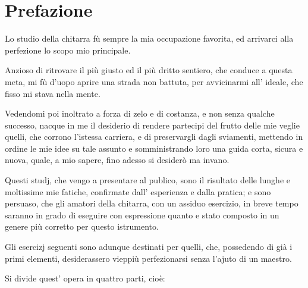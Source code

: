 \documentclass[a4paper]{article}
\begin{document}
\section*{Prefazione}

Lo studio della chitarra fù sempre la mia occupazione favorita, ed arrivarci alla perfezione lo scopo mio principale.

Anzioso di ritrovare il più giusto ed il più dritto sentiero, che conduce a questa meta, mi fù d'uopo aprire una strada non battuta, per avvicinarmi all' ideale, che fisso mi stava nella mente.

Vedendomi poi inoltrato a forza di zelo e di costanza, e non senza qualche successo, nacque in me il desiderio di rendere partecipi del frutto delle mie veglie quelli, che corrono l'istessa carriera, e di preservargli dagli sviamenti, mettendo in ordine le mie idee su tale assunto e somministrando loro una guida corta, sicura e nuova, quale, a mio sapere, fino adesso si desiderò ma invano.

Questi studj, che vengo a presentare al publico, sono il risultato delle lunghe e moltissime mie fatiche, confirmate %
dall' esperienza e dalla pratica; e sono persuaso, che gli amatori della chitarra, con un assiduo esercizio, in breve tempo saranno in grado di eseguire con espressione quanto e %
stato composto in un genere più corretto per questo istrumento.

Gli esercizj seguenti sono adunque destinati per quelli, che, possedendo di già i primi elementi, desiderassero vieppiù perfezionarsi senza l'ajuto di un maestro.

Si divide quest' opera in quattro parti, cioè:
\end{document}
